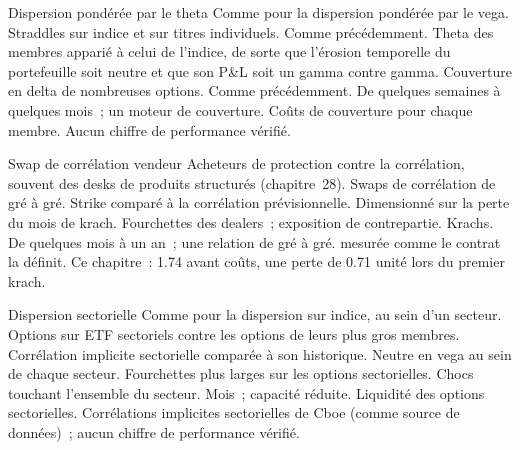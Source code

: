 \begin{strategyfile}{Dispersion pondérée par le theta}\label{strat:s2:dispersion-and-correlation:theta}
 Comme pour la dispersion pondérée par le vega.
 Straddles sur indice et sur titres individuels.
 Comme précédemment.
 Theta des membres apparié à celui de l'indice, de sorte que l'érosion temporelle du portefeuille soit neutre et que son P\&L soit un gamma contre gamma.
 Couverture en delta de nombreuses options.
 Comme précédemment.
 De quelques semaines à quelques mois~; un moteur de couverture.
 Coûts de couverture pour chaque membre.
 Aucun chiffre de performance vérifié.
\end{strategyfile}

\begin{strategyfile}{Swap de corrélation vendeur}\label{strat:s2:dispersion-and-correlation:corrswap}
 Acheteurs de protection contre la corrélation, souvent des desks de produits structurés (chapitre~28).
 Swaps de corrélation de gré à gré.
 Strike comparé à la corrélation prévisionnelle.
 Dimensionné sur la perte du mois de krach.
 Fourchettes des dealers~; exposition de contrepartie.
 Krachs.
 De quelques mois à un an~; une relation de gré à gré.
  mesurée comme le contrat la définit.
 Ce chapitre~: 1.74 avant coûts, une perte de 0.71 unité lors du premier krach.
\end{strategyfile}

\begin{strategyfile}{Dispersion sectorielle}\label{strat:s2:dispersion-and-correlation:sector}
 Comme pour la dispersion sur indice, au sein d'un secteur.
 Options sur ETF sectoriels contre les options de leurs plus gros membres.
 Corrélation implicite sectorielle comparée à son historique.
 Neutre en vega au sein de chaque secteur.
 Fourchettes plus larges sur les options sectorielles.
 Chocs touchant l'ensemble du secteur.
 Mois~; capacité réduite.
 Liquidité des options sectorielles.
 Corrélations implicites sectorielles de Cboe (comme source de données)~; aucun chiffre de performance vérifié.
\end{strategyfile}

